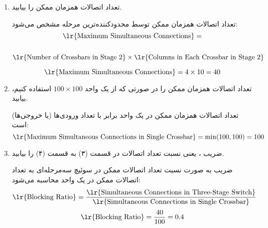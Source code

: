 \begin{enumerate}
\begin{qsolve}
	\end{qsolve}
	
	\item 
	تعداد اتصالات همزمان ممکن را بیابید.
	
	\begin{qsolve}
		
		تعداد اتصالات همزمان ممکن توسط محدودکننده‌ترین مرحله مشخص می‌شود:
		$$\text{\lr{Maximum Simultaneous Connections}} =$$\\
		$\text{\lr{Number of Crossbars in Stage 2}} \times \text{\lr{Columns in Each Crossbar in Stage 2}}$

		\[
		\text{\lr{Maximum Simultaneous Connections}} = 4 \times 10 = 40
		\]
	\end{qsolve}
	
	
	\item 
	تعداد اتصالات همزمان ممکن را در صورتی که از یک  واحد $100 \times 100 $ استفاده کنیم، بیابید.
	\begin{qsolve}
		
		تعداد اتصالات همزمان ممکن در یک  واحد برابر با تعداد ورودی‌ها (یا خروجی‌ها) است:
		\[
		\text{\lr{Maximum Simultaneous Connections in Single Crossbar}} = \min(100, 100) = 100
		\]
	\end{qsolve}
	
	
	\item 
	ضریب ، یعنی نسبت تعداد اتصالات در قسمت (۳) به قسمت (۴) را بیابید.
	
	\begin{qsolve}
		    ضریب  به صورت نسبت تعداد اتصالات ممکن در سوئیچ سه‌مرحله‌ای به تعداد اتصالات ممکن در یک  واحد محاسبه می‌شود:
		\[
		\text{\lr{Blocking Ratio}} = \frac{\text{\lr{Simultaneous Connections in Three-Stage Switch}}}{\text{\lr{Simultaneous Connections in Single Crossbar}}}
		\]
		\[
		\text{\lr{Blocking Ratio}} = \frac{40}{100} = 0.4
		\]
		
	\end{qsolve}
\end{enumerate}
